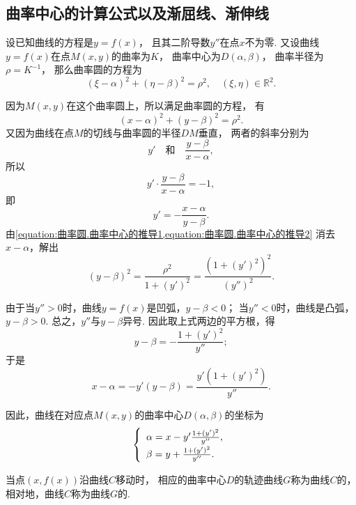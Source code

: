 \subsection{曲率中心的计算公式以及渐屈线、渐伸线}
设已知曲线的方程是\(y=f(x)\)，
且其二阶导数\(y''\)在点\(x\)不为零.
又设曲线\(y=f(x)\)在点\(M(x,y)\)的曲率为\(K\)，
曲率中心为\(D(\alpha,\beta)\)，
曲率半径为\(\rho=K^{-1}\)，
那么曲率圆的方程为\[
	(\xi-\alpha)^2+(\eta-\beta)^2=\rho^2,
	\quad(\xi,\eta)\in\mathbb{R}^2.
\]

因为\(M(x,y)\)在这个曲率圆上，所以满足曲率圆的方程，
有\begin{equation}\label{equation:曲率圆.曲率中心的推导1}
	(x-\alpha)^2+(y-\beta)^2=\rho^2.
\end{equation}
又因为曲线在点\(M\)的切线与曲率圆的半径\(DM\)垂直，
两者的斜率分别为\[
	y'
	\quad\text{和}\quad
	\frac{y-\beta}{x-\alpha},
\]
所以\[
	y' \cdot \frac{y-\beta}{x-\alpha} = -1,
\]
即\begin{equation}\label{equation:曲率圆.曲率中心的推导2}
	y' = -\frac{x-\alpha}{y-\beta}.
\end{equation}
由\cref{equation:曲率圆.曲率中心的推导1,equation:曲率圆.曲率中心的推导2}
消去\(x-\alpha\)，解出\[
	(y-\beta)^2
	=\frac{\rho^2}{1+(y')^2}
	=\frac{(1+(y')^2)^2}{(y'')^2}.
\]

由于当\(y''>0\)时，曲线\(y=f(x)\)是凹弧，\(y-\beta<0\)；
当\(y''<0\)时，曲线是凸弧，\(y-\beta>0\).
总之，\(y''\)与\(y-\beta\)异号.
因此取上式两边的平方根，得\[
	y-\beta
	=-\frac{1+(y')^2}{y''};
\]
于是\[
	x-\alpha
	=-y'(y-\beta)
	=\frac{y'(1+(y')^2)}{y''}.
\]

因此，曲线在对应点\(M(x,y)\)的曲率中心\(D(\alpha,\beta)\)的坐标为
\begin{equation}
	\left\{ \def\arraystretch{1.5} \begin{array}{l}
		\alpha = x - y' \frac{1 + (y')^2}{y''}, \\
		\beta = y + \frac{1 + (y')^2}{y''}.
	\end{array} \right.
\end{equation}

当点\((x,f(x))\)沿曲线\(C\)移动时，
相应的曲率中心\(D\)的轨迹曲线\(G\)称为曲线\(C\)的，
相对地，曲线\(C\)称为曲线\(G\)的.
